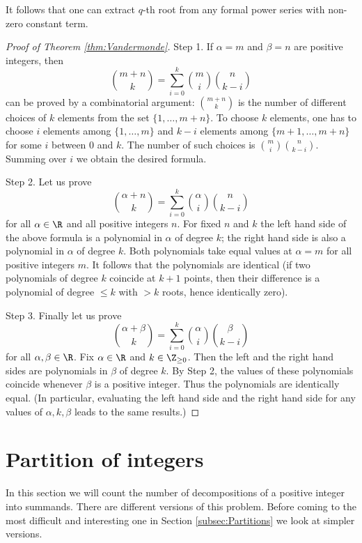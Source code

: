 \begin{page}
\setcounter{section}{3}
\setcounter{subsection}{0}
\setcounter{dfn}{17}
\label{portion:778}


It follows that one can extract $q$-th root from any formal power series with non-zero constant term.

\begin{proof}[Proof of Theorem \ref{thm:Vandermonde}]
Step 1. If $\alpha = m$ and $\beta = n$ are positive integers, then
\[
\binom{m + n}{k} = \sum_{i=0}^k \binom{m}{i} \binom{n}{k-i}
\]
can be proved by a combinatorial argument: $\binom{m+n}{k}$ is the number of different choices of $k$ elements from the set $\{1, \ldots, m+n\}$.
To choose $k$ elements, one has to choose $i$ elements among $\{1, \ldots, m\}$ and $k-i$ elements among $\{m+1, \ldots, m+n\}$ for some $i$ between $0$ and $k$.
The number of such choices is $\binom{m}{i} \binom{n}{k-i}$.
Summing over $i$ we obtain the desired formula.

Step 2. Let us prove
\[
\binom{\alpha + n}{k} = \sum_{i=0}^k \binom{\alpha}{i} \binom{n}{k-i}
\]
for all $\alpha \in \R$ and all positive integers $n$.
For fixed $n$ and $k$ the left hand side of the above formula is a polynomial in $\alpha$ of degree $k$;
the right hand side is also a polynomial in $\alpha$ of degree $k$.
Both polynomials take equal values at $\alpha = m$ for all positive integers $m$.
It follows that the polynomials are identical
(if two polynomials of degree $k$ coincide at $k+1$ points, then their difference is a polynomial of degree $\le k$ with $> k$ roots, hence identically zero).

Step 3. Finally let us prove
\[
\binom{\alpha + \beta}{k} = \sum_{i=0}^k \binom{\alpha}{i} \binom{\beta}{k-i}
\]
for all $\alpha, \beta \in \R$.
Fix $\alpha \in \R$ and $k \in \Z_{\ge 0}$. Then the left and the right hand sides are polynomials in $\beta$ of degree $k$.
By Step 2, the values of these polynomials coincide whenever $\beta$ is a positive integer.
Thus the polynomials are identically equal.
(In particular, evaluating the left hand side and the right hand side for any values of $\alpha, k, \beta$ leads to the same results.)
\end{proof}






\end{page}

\begin{page}
\setcounter{section}{3}
\setcounter{subsection}{1}
\setcounter{dfn}{0}
\label{portion:779}

\section{Partition of integers}
In this section we will count the number of decompositions of a positive integer into summands.
There are different versions of this problem.
Before coming to the most difficult and interesting one in Section \ref{subsec:Partitions} we look at simpler versions.




\end{page}

